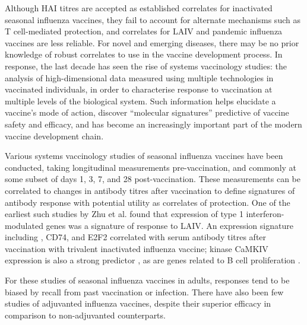 Although \gls{HAI} titres are accepted as established correlates for inactivated seasonal influenza vaccines, they fail to account for alternate mechanisms such as T cell-mediated protection, and correlates for \gls{LAIV} and pandemic influenza vaccines are less reliable\autocite{houser2015InfluenzaVaccinesChallenges}.
For novel and emerging diseases, there may be no prior knowledge of robust correlates to use in the vaccine development process.
In response, the last decade has seen the rise of systems vaccinology studies: the analysis of high-dimensional data measured using multiple technologies in vaccinated individuals, in order to characterise response to vaccination at multiple levels of the biological system\autocite{pulendran2014SystemsVaccinologyProbing}.
Such information helps elucidate a vaccine's mode of action, discover \enquote{molecular signatures} predictive of vaccine safety and efficacy, and has become an increasingly important part of the modern vaccine development chain\autocite{hagan2015SystemsVaccinologyEnabling,raeven2019SystemsVaccinologyBig}.

Various systems vaccinology studies of seasonal influenza vaccines have been conducted, taking longitudinal measurements pre-vaccination, and commonly at some subset of days 1, 3, 7, and 28 post-vaccination.
These measurements can be correlated to changes in antibody titres after vaccination to define signatures of antibody response with potential utility as correlates of protection.
One of the earliest such studies by Zhu et al.\autocite{zhu2010WholeGenomeTranscriptional} found that expression of type 1 interferon-modulated genes was a signature of response to \gls{LAIV}.
An expression signature including , CD74, and E2F2 correlated with serum antibody titres after vaccination with trivalent inactivated influenza vaccine\autocite{bucasas2011EarlyPatternsGene}; kinase CaMKIV expression is also a strong predictor \autocite{nakaya2011SystemsBiologyVaccination}, as are genes related to B cell proliferation \autocite{tan2014GeneSignaturesRelated}.

For these studies of seasonal influenza vaccines in adults, responses tend to be biased by recall from past vaccination or infection\autocite{bucasas2011EarlyPatternsGene, nakaya2012SystemsVaccinologyLearning}.
There have also been few studies of adjuvanted influenza vaccines, despite their superior efficacy in comparison to non-adjuvanted counterparts\autocite{wilkins2017AS03MF59AdjuvantedInfluenza,tregoning2018AdjuvantedInfluenzaVaccines}.

